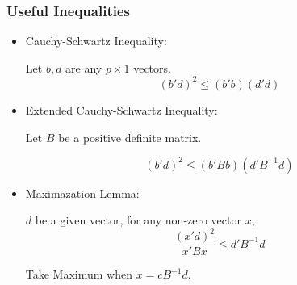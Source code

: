         


    \subsubsection{Useful Inequalities}
    \begin{itemize}[topsep=6pt,itemsep=4pt]
        \item Cauchy-Schwartz Inequality:
        
        Let $ b,d$ are any $ p\times 1 $ vectors.
        \begin{equation}
            (b'd)^2\leq (b'b)(d'd) 
        \end{equation}
        
        \item Extended Cauchy-Schwartz Inequality: 
        
        Let $ B $ be a positive definite matrix.
        
        \begin{equation}
            (b'd)^2\leq(b'Bb)(d'B^{-1}d) 
        \end{equation}
        
        \item Maximazation Lemma:
        
        $ d $ be a given vector, for any non-zero vector $ x $,
        \begin{equation}
            \dfrac{(x'd)^2}{x'Bx}\leq d'B^{-1}d 
        \end{equation}

        Take Maximum when $ x=cB^{-1}d $.
        
        
    \end{itemize}

        

